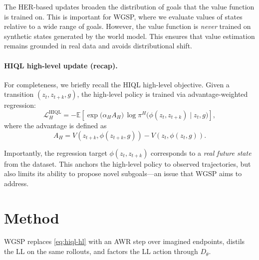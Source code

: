 The HER-based updates broaden the distribution of goals that the value
function is trained on. This is important for WGSP, where we evaluate
values of states relative to a wide range of goals. However, the value
function is \emph{never} trained on synthetic states generated by the
world model. This ensures that value estimation remains grounded in
real data and avoids distributional shift.

\paragraph{HIQL high-level update (recap).}
For completeness, we briefly recall the HIQL high-level objective. Given
a transition $(z_t, z_{t+k}, g)$, the high-level policy is trained via
advantage-weighted regression:
\begin{equation}
\mathcal{L}_H^{\mathrm{HIQL}} =
-\mathbb{E}\!\left[
\exp\!\big(\alpha_H A_H\big)\,
\log \pi^H\!\big(\phi(z_t, z_{t+k}) \mid z_t, g\big)
\right],
\end{equation}
where the advantage is defined as
\begin{equation}
A_H =
V(z_{t+k}, \phi(z_{t+k}, g))
-
V(z_t, \phi(z_t, g)).
\end{equation}

Importantly, the regression target $\phi(z_t, z_{t+k})$ corresponds to
a \emph{real future state} from the dataset. This anchors the high-level
policy to observed trajectories, but also limits its ability to propose
novel subgoals—an issue that WGSP aims to address.

\section{Method}
\label{sec:wgsp:method}

WGSP replaces \eqref{eq:hiql-hl} with an AWR step over imagined
endpoints, distils the LL on the same rollouts, and factors the
LL action through $D_\theta$.



